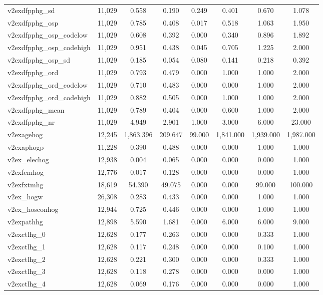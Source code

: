 \begin{table}[!htbp]
\begin{tabular}{@{\extracolsep{5pt}}lccccccc}
v2exdfpphg\_sd & 11,029 & 0.558 & 0.190 & 0.249 & 0.401 & 0.670 & 1.078 \\ 
v2exdfpphg\_osp & 11,029 & 0.785 & 0.408 & 0.017 & 0.518 & 1.063 & 1.950 \\ 
v2exdfpphg\_osp\_codelow & 11,029 & 0.608 & 0.392 & 0.000 & 0.340 & 0.896 & 1.892 \\ 
v2exdfpphg\_osp\_codehigh & 11,029 & 0.951 & 0.438 & 0.045 & 0.705 & 1.225 & 2.000 \\ 
v2exdfpphg\_osp\_sd & 11,029 & 0.185 & 0.054 & 0.080 & 0.141 & 0.218 & 0.392 \\ 
v2exdfpphg\_ord & 11,029 & 0.793 & 0.479 & 0.000 & 1.000 & 1.000 & 2.000 \\ 
v2exdfpphg\_ord\_codelow & 11,029 & 0.710 & 0.483 & 0.000 & 0.000 & 1.000 & 2.000 \\ 
v2exdfpphg\_ord\_codehigh & 11,029 & 0.882 & 0.505 & 0.000 & 1.000 & 1.000 & 2.000 \\ 
v2exdfpphg\_mean & 11,029 & 0.789 & 0.404 & 0.000 & 0.600 & 1.000 & 2.000 \\ 
v2exdfpphg\_nr & 11,029 & 4.949 & 2.901 & 1.000 & 3.000 & 6.000 & 23.000 \\ 
v2exagehog & 12,245 & 1,863.396 & 209.647 & 99.000 & 1,841.000 & 1,939.000 & 1,987.000 \\ 
v2exaphogp & 11,228 & 0.390 & 0.488 & 0.000 & 0.000 & 1.000 & 1.000 \\ 
v2ex\_elechog & 12,938 & 0.004 & 0.065 & 0.000 & 0.000 & 0.000 & 1.000 \\ 
v2exfemhog & 12,776 & 0.017 & 0.128 & 0.000 & 0.000 & 0.000 & 1.000 \\ 
v2exfxtmhg & 18,619 & 54.390 & 49.075 & 0.000 & 0.000 & 99.000 & 100.000 \\ 
v2ex\_hogw & 26,308 & 0.283 & 0.433 & 0.000 & 0.000 & 1.000 & 1.000 \\ 
v2ex\_hosconhog & 12,944 & 0.725 & 0.446 & 0.000 & 0.000 & 1.000 & 1.000 \\ 
v2expathhg & 12,898 & 5.590 & 1.681 & 0.000 & 6.000 & 6.000 & 9.000 \\ 
v2exctlhg\_0 & 12,628 & 0.177 & 0.263 & 0.000 & 0.000 & 0.333 & 1.000 \\ 
v2exctlhg\_1 & 12,628 & 0.117 & 0.248 & 0.000 & 0.000 & 0.100 & 1.000 \\ 
v2exctlhg\_2 & 12,628 & 0.221 & 0.300 & 0.000 & 0.000 & 0.333 & 1.000 \\ 
v2exctlhg\_3 & 12,628 & 0.118 & 0.278 & 0.000 & 0.000 & 0.000 & 1.000 \\ 
v2exctlhg\_4 & 12,628 & 0.069 & 0.176 & 0.000 & 0.000 & 0.000 & 1.000 \\ 

\end{tabular}
\end{table}

